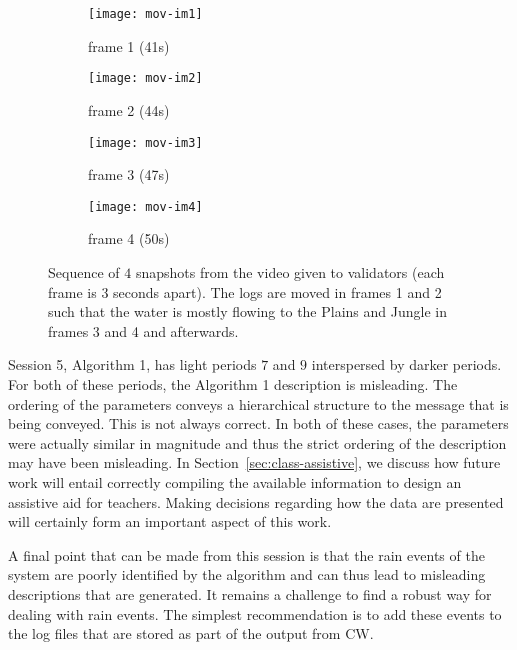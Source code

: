 \begin{appendices}
\begin{figure}
\centering
\begin{subfigure}{.24\textwidth}
  \centering
  \texttt{[image: mov-im1]}
  \caption{frame 1 (41s)}
\end{subfigure}%
\begin{subfigure}{.24\textwidth}
  \centering
  \texttt{[image: mov-im2]}
  \caption{frame 2 (44s)}
\end{subfigure}
\begin{subfigure}{.24\textwidth}
  \centering
  \texttt{[image: mov-im3]}
  \caption{frame 3 (47s)}
\end{subfigure}
\begin{subfigure}{.24\textwidth}
  \centering
  \texttt{[image: mov-im4]}
  \caption{frame 4 (50s)}
\end{subfigure}
\caption{Sequence of $4$ snapshots from the video given to validators (each frame is 3 seconds apart). The logs are moved in frames 1 and 2 such that the water is mostly flowing to the Plains and Jungle in frames 3 and 4 and afterwards.}
\label{fig:test}
\end{figure}

Session 5, Algorithm 1, has light periods $7$ and $9$ interspersed by darker periods. For both of these periods, the Algorithm 1 description is misleading. The ordering of the parameters conveys a hierarchical structure to the message that is being conveyed. This is not always correct. In both of these cases, the parameters were actually similar in magnitude and thus the strict ordering of the description may have been misleading. In Section~\ref{sec:class-assistive}, we discuss how future work will entail correctly compiling the available information to design an assistive aid for teachers. Making decisions regarding how the data are presented will certainly form an important aspect of this work.

A final point that can be made from this session is that the rain events of the system are poorly identified by the algorithm and can thus lead to misleading descriptions that are generated. It remains a challenge to find a robust way for dealing with rain events. The simplest recommendation is to add these events to the log files that are stored as part of the output from CW.



\end{appendices}
